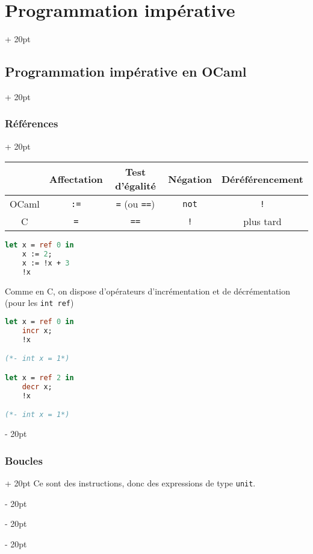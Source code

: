 \documentclass[a4paper, 12pt, twoside]{article}
\newcommand{\ind}[1][20pt]{\advance\leftskip + #1}
\newcommand{\deind}[1][20pt]{\advance\leftskip - #1}
\newenvironment{indentedenv}[1][20pt]{\par \ind[#1]}{\par \deind}
\newenvironment{indt}[2][20pt]{#2 \begin{indentedenv}[#1]}{\end{indentedenv}} %
\begin{document}
\begin{indt}{\section{Programmation impérative}}
\begin{indt}{\subsection{Programmation impérative en OCaml}}
\begin{indt}{\subsubsection{Références}}
                \begin{tabular}{|c|c|c|c|c|}
                    \hline
                    & Affectation
                    & Test d'égalité
                    & Négation
                    & Déréférencement
                    \\
                    \hline
                    OCaml
                    & \texttt{:=}
                    & \texttt{=} (ou \texttt{==})
                    & \texttt{not}
                    & \texttt{!}
                    \\
                    \hline
                    C
                    & \texttt{=}
                    & \texttt{==}
                    & \texttt{!}
                    & plus tard
                    \\
                    \hline
                \end{tabular}
                
                \vspace{6pt}
                
                \begin{lstlisting}[language=Caml, xleftmargin=80pt]
let x = ref 0 in
    x := 2;
    x := !x + 3
    !x
                \end{lstlisting}
                
                \vspace{6pt}
                
                Comme en C, on dispose d'opérateurs d'incrémentation et de décrémentation (pour les \texttt{int ref})
                
                \vspace{6pt}
                
                \begin{lstlisting}[language=Caml, xleftmargin=80pt]
let x = ref 0 in
    incr x;
    !x

(*- int x = 1*)

let x = ref 2 in
    decr x;
    !x

(*- int x = 1*)
                \end{lstlisting}

            \end{indt}
            
            \vspace{6pt}
            
            \begin{indt}{\subsubsection{Boucles}}
                Ce sont des instructions, donc des expressions de type \texttt{unit}.
                

\end{indt}
\end{indt}
\end{indt}
\end{document}
